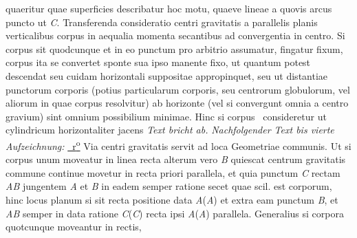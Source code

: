 quaeritur quae superficies describatur hoc motu, quaeve lineae a quovis arcus puncto ut \textit{C}.
\pend
\pstart
Transferenda consideratio centri gravitatis 
a parallelis planis verticalibus corpus in aequalia momenta secantibus
ad convergentia in centro.
Si corpus sit quodcunque et in eo punctum pro arbitrio assumatur, fingatur fixum,
corpus ita se convertet sponte sua ipso manente fixo, ut quantum potest descendat
seu cuidam horizontali suppositae appropinquet, seu ut distantiae punctorum corporis
(potius particularum corporis, seu centrorum globulorum, vel aliorum in quae corpus resolvitur)
ab horizonte (vel si convergunt omnia a centro gravium)
sint omnium possibilium minimae.
Hinc si corpus \astrosun\ consideretur ut cylindricum horizontaliter jacens
\lbrack\textit{Text bricht ab.}\rbrack
{}
\pend
\vspace{.5em}
\pstart
\noindent
\lbrack\textit{Nachfolgender Text bis  vierte Aufzeichnung:}\rbrack
\pend
\nobreak
\vspace{.5em}
\pstart
\noindent
{}%
\href{\Scan{LH_35_08_30_133r}}%
{~r\textsuperscript{o}\rbrack} 
Via centri gravitatis servit ad loca Geometriae communis.
Ut si corpus unum 
moveatur in linea recta alterum vero \textit{B} quiescat centrum gravitatis commune 
continue movetur 
in recta priori parallela, et quia punctum \textit{C}
rectam \textit{AB} jungentem \textit{A} et \textit{B} 
in eadem semper ratione secet quae scil. est corporum,
hinc locus planum\bracks{,} si sit recta positione data \textit{A}(\textit{A}) 
et extra eam punctum \textit{B}, et \textit{AB} semper in data ratione 
\textit{C}(\textit{C}) recta ipsi \textit{A}(\textit{A}) parallela.
\pend
\pstart
Generalius si corpora quotcunque moveantur in rectis,

